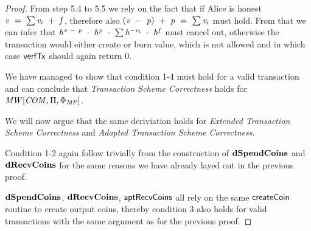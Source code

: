 \begin{proof}
    From step 5.4 to 5.5 we rely on the fact that if Alice is honest $\mathit{v} ~=~ \sum \mathit{v}_i ~+~ \mathit{f}$, therefore also $(\mathit{v} ~-~ \mathit{p}) ~+~ \mathit{p} ~=~ \sum \mathit{v}_i$ must hold.
    From that we can infer that $\mathit{h}^{\mathit{v} ~-~ \mathit{p}} ~\cdot~ \mathit{h}^{\mathit{p}} ~\cdot~ \sum \mathit{h}^{- \mathit{v}_i} ~\cdot~ \mathit{h}^{\mathit{f}}$ must cancel out, otherwise the transaction would either create or burn value, which is not allowed and in which case $\mathsf{verfTx}$ should again return 0.

    We have managed to show that condition 1-4 must hold for a valid transaction and can conclude that \emph{Transaction Scheme Correctness} holds for $\mathit{MW}[\mathit{COM},\Pi,\Phi_{\mathit{MP}}]$.

    We will now argue that the same deriviation holds for \emph{Extended Transaction Scheme Correctness} and \emph{Adapted Transaction Scheme Correctness}.

    Condition 1-2 again follow trivially from the construction of $\mathbf{dSpendCoins}$ and $\mathbf{dRecvCoins}$ for the same reasons we have already layed out in the previous proof.

    $\mathbf{dSpendCoins}$, $\mathbf{dRecvCoins}$, $\mathsf{aptRecvCoins}$ all rely on the same $\mathsf{createCoin}$ routine to create output coins, thereby condition 3 also holds for valid transactions with the same argument as for the previous proof.


\end{proof}
